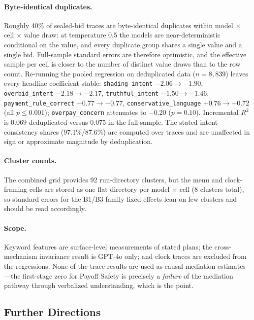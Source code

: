 \paragraph{Byte-identical duplicates.} Roughly 40\% of sealed-bid traces are byte-identical duplicates within model $\times$ cell $\times$ value draw: at temperature 0.5 the models are near-deterministic conditional on the value, and every duplicate group shares a single value and a single bid. Full-sample standard errors are therefore optimistic, and the effective sample per cell is closer to the number of distinct value draws than to the row count. Re-running the pooled regression on deduplicated data ($n = 8{,}839$) leaves every headline coefficient stable: \texttt{shading\_intent} $-2.06 \to -1.90$, \texttt{overbid\_intent} $-2.18 \to -2.17$, \texttt{truthful\_intent} $-1.50 \to -1.46$, \texttt{payment\_rule\_correct} $-0.77 \to -0.77$, \texttt{conservative\_language} $+0.76 \to +0.72$ (all $p \leq 0.001$); \texttt{overpay\_concern} attenuates to $-0.20$ ($p = 0.10$). Incremental $R^{2}$ is $0.069$ deduplicated versus $0.075$ in the full sample. The stated-intent consistency shares (97.1\%/87.6\%) are computed over traces and are unaffected in sign or approximate magnitude by deduplication.

\paragraph{Cluster counts.} The combined grid provides 92 run-directory clusters, but the menu and clock-framing cells are stored as one flat directory per model $\times$ cell (8 clusters total), so standard errors for the B1/B3 family fixed effects lean on few clusters and should be read accordingly.

\paragraph{Scope.} Keyword features are surface-level measurements of stated plans; the cross-mechanism invariance result is GPT-4o only; and clock traces are excluded from the regressions. None of the trace results are used as causal mediation estimates---the first-stage zero for Payoff Safety is precisely a \emph{failure} of the mediation pathway through verbalized understanding, which is the point.

\subsection{Further Directions}\label{app:traces-directions}


